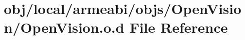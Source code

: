 \hypertarget{objs_2_open_vision_2_open_vision_8o_8d}{\section{obj/local/armeabi/objs/\-Open\-Vision/\-Open\-Vision.o.\-d \-File \-Reference}
\label{objs_2_open_vision_2_open_vision_8o_8d}
}
